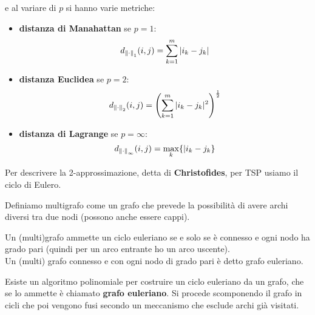 															e al variare di $p$ si hanno varie metriche:
															\begin{itemize}
																\item \textbf{distanza di Manahattan} se $p=1$:
																      \[d_{\norm{\cdot}_1}(i,j)=\sum_{k=1}^m|i_k-j_k|\]
																\item \textbf{distanza Euclidea} se $p=2$:
																      \[d_{\norm{\cdot}_2}(i,j)=\left(\sum_{k=1}^m
																      	|i_k-j_k|^2\right)^{\frac{1}{2}}\]
																      	\item \textbf{distanza di Lagrange} se $p=\infty$:
																      	\[d_{\norm{\cdot}_\infty}(i,j)=\max_k\{|i_k-j_k\}\]
																      	\end{itemize}
																      	Per descrivere la 2-approssimazione, detta di \textbf{Christofides}, per TSP
																      	usiamo il ciclo di Eulero.
																      	\begin{definizione}
																      		Definiamo multigrafo come un grafo che prevede la possibilità di avere archi
																      		diversi tra due nodi (possono anche essere cappi).
																      	\end{definizione}
																      	\begin{teorema}[teorema di Eulero]
																      		Un (multi)grafo ammette un ciclo euleriano se e solo se è connesso e ogni nodo
																      		ha grado pari (quindi per un arco entrante ho un arco uscente).\\
																      		Un (multi) grafo connesso e con ogni nodo di grado pari è detto grafo
																      		euleriano. 
																      	\end{teorema}
																      	Esiste un algoritmo polinomiale per costruire un ciclo euleriano da un grafo,
																      	che se lo ammette è chiamato \textbf{grafo euleriano}. Si procede scomponendo il
																      	grafo in cicli che poi vengono fusi secondo un meccanismo che esclude archi già
																      	visitati.\\
																      																	      	
